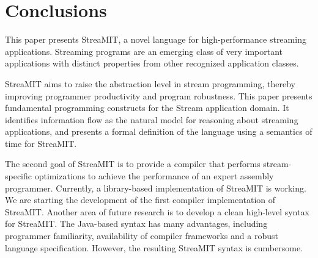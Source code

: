 \section{Conclusions}
\label{sec:conc}

This paper presents StreaMIT, a novel language for high-performance
streaming applications.  Streaming programs are an emerging class of
very important applications with distinct properties from other
recognized application classes.

StreaMIT aims to raise the abstraction level in stream programming,
thereby improving programmer productivity and program robustness. This
paper presents fundamental programming constructs for the Stream
application domain. It identifies information flow as the natural
model for reasoning about streaming applications, and presents a
formal definition of the language using a semantics of time for
StreaMIT.

The second goal of StreaMIT is to provide a compiler that performs
stream-specific optimizations to achieve the performance of an expert
assembly programmer. Currently, a library-based implementation of
StreaMIT is working. We are starting the development of the first
compiler implementation of StreaMIT. Another area of future research
is to develop a clean high-level syntax for StreaMIT. The Java-based
syntax has many advantages, including programmer familiarity,
availability of compiler frameworks and a robust language
specification. However, the resulting StreaMIT syntax is cumbersome.



